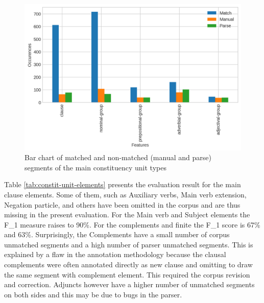     \begin{figure}[!ht]
        \centering
        \includegraphics[width=.65\textwidth]{evaluation-results/figures/accuracy-syntactic-group-types}
        \caption{Bar chart of matched and non-matched (manual and parse) segments of the main constituency unit types}
        \label{fig:constit-unit-types}
    \end{figure}

    Table \ref{tab:constit-unit-elements} presents the evaluation result for the main clause elements. Some of them, such as Auxiliary verbs, Main verb extension, Negation particle, and others have been omitted in the corpus and are thus missing in the present evaluation. For the Main verb and Subject elements the F_1 measure raises to 90\%. For the complements and finite the F_1 score is 67\% and 63\%. Surprisingly, the Complements have a small number of corpus unmatched segments and a high number of parser unmatched segments. This is explained by a flaw in the annotation methodology because the clausal complements were often annotated directly as new clause and omitting to draw the same segment with complement element. This required the corpus revision and correction. Adjuncts however have a higher number of unmatched segments on both sides and this may be due to bugs in the parser.

